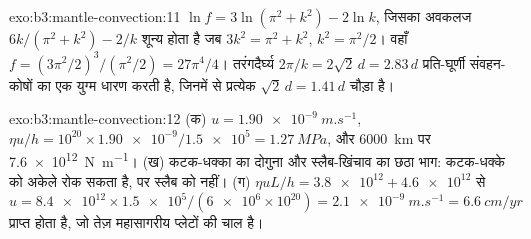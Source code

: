 \begin{solution}{exo:b3:mantle-convection:11}
$\ln f = 3\ln(\pi^2 + k^2) - 2\ln k$, जिसका अवकलज $6k/(\pi^2 + k^2) - 2/k$
शून्य होता है जब $3k^2 = \pi^2 + k^2$, $k^2 = \pi^2/2$। वहाँ $f = (3\pi^2/2)^3/
(\pi^2/2) = 27\pi^4/4$। तरंगदैर्घ्य $2\pi/k = 2\sqrt2\,d = 2.83\,d$ प्रति-घूर्णी
संवहन-कोषों का एक युग्म धारण करती है, जिनमें से प्रत्येक $\sqrt2\,d = 1.41\,d$ चौड़ा है।
\end{solution}

\begin{solution}{exo:b3:mantle-convection:12}
(क) $u = \qty{1.90e-9}{m.s^{-1}}$, $\eta u/h = 10^{20}\times\num{1.90e-9}/
\num{1.5e5} = \qty{1.27}{MPa}$, और \qty{6000}{km} पर \qty{7.6e12}{N.m^{-1}}।
(ख) कटक-धक्का का दोगुना और स्लैब-खिंचाव का छठा भाग: 
कटक-धक्के को अकेले रोक सकता है, पर स्लैब को नहीं। (ग) $\eta uL/h = \num{3.8e12} +
\num{4.6e12}$ से $u = \num{8.4e12}\times\num{1.5e5}/(\num{6e6}\times10^{20})
= \qty{2.1e-9}{m.s^{-1}} = \qty{6.6}{cm/yr}$ प्राप्त होता है, जो तेज़
महासागरीय प्लेटों की चाल है।
\end{solution}

